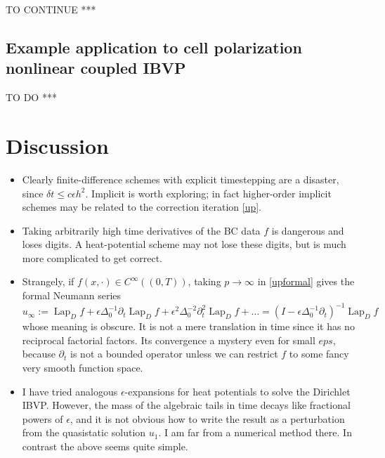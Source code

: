 \documentclass[10pt]{article}
\newcommand{\bi}{\begin{itemize}}
\newcommand{\ei}{\end{itemize}}
\newcommand{\be}{\begin{equation}}
\newcommand{\ee}{\end{equation}}
\newcommand{\eps}{\epsilon}
\newcommand{\dt}{\partial_t}
\DeclareMathOperator{\Lap}{Lap}
\begin{document}
TO CONTINUE ***


\subsection{Example application to cell polarization nonlinear coupled IBVP}


TO DO ***






\section{Discussion}

\bi
\item
  Clearly finite-difference schemes with explicit timestepping are
  a disaster, since $\delta t \le c \eps h^2$.
  Implicit is worth exploring; in fact higher-order
  implicit schemes may be related to the correction iteration \eqref{up}.
\item
  Taking arbitrarily high time derivatives of the BC data $f$ is dangerous
  and loses digits. A heat-potential scheme may not lose these digits,
  but is much more complicated to get correct.
\item
Strangely, if $f(x,\cdot) \in C^\infty((0,T))$,
taking $p\to\infty$ in \eqref{upformal} gives the formal Neumann series
\be
u_\infty := \Lap_D f + \eps \Delta_0^{-1} \dt \Lap_D f + \eps^2 \Delta_0^{-2} \dt^2 \Lap_D f + \dots
= (I - \eps \Delta_0^{-1} \dt)^{-1} \Lap_D f
\ee
whose meaning is obscure.
It is not a mere translation in time since it has no
reciprocal factorial factors. Its convergence a mystery
even for small $eps$, because $\dt$ is not a bounded operator
unless we can restrict $f$ to some fancy very smooth function space.
\item
  I have tried analogous $\eps$-expansions for heat potentials
  to solve the Dirichlet IBVP.
  However, the mass of the algebraic tails in time decays like
  fractional powers of $\eps$, and it is not obvious how to
  write the result as a perturbation from the quasistatic solution $u_1$.
  I am far from a numerical method there. In contrast the above seems
  quite simple.
  \ei




\end{document}
